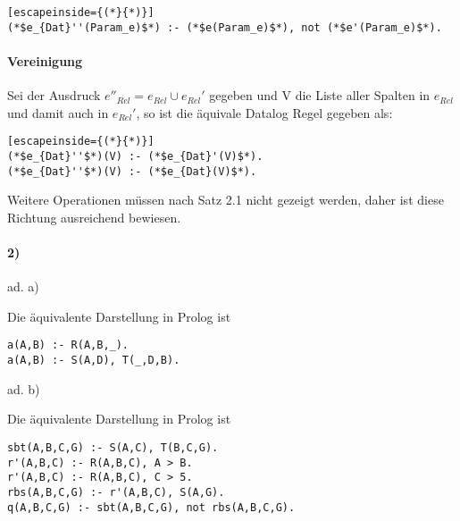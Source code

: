 \documentclass[12pt,a4paper]{amsart}
\begin{document}
\begin{aufgabe1}
\begin{lstlisting}[escapeinside={(*}{*)}]
(*$e_{Dat}''(Param_e)$*) :- (*$e(Param_e)$*), not (*$e'(Param_e)$*).
\end{lstlisting}

\paragraph{\textbf{Vereinigung}}
Sei der Ausdruck $e''_{Rel} = e_{Rel} \cup e_{Rel}'$ gegeben und V die Liste aller Spalten in $e_{Rel}$ und damit auch in $e_{Rel}'$, so ist die äquivale Datalog Regel gegeben als:

\begin{lstlisting}[escapeinside={(*}{*)}]
(*$e_{Dat}''$*)(V) :- (*$e_{Dat}'(V)$*).
(*$e_{Dat}''$*)(V) :- (*$e_{Dat}(V)$*).
\end{lstlisting}

Weitere Operationen müssen nach Satz 2.1 nicht gezeigt werden, daher ist diese Richtung ausreichend bewiesen.

\paragraph{2)}

\end{aufgabe1}


\begin{aufgabe1}
ad. a)

Die äquivalente Darstellung in Prolog ist

\begin{lstlisting}
a(A,B) :- R(A,B,_).
a(A,B) :- S(A,D), T(_,D,B).
\end{lstlisting}

ad. b)

Die äquivalente Darstellung in Prolog ist


\begin{lstlisting}
sbt(A,B,C,G) :- S(A,C), T(B,C,G).
r'(A,B,C) :- R(A,B,C), A > B.
r'(A,B,C) :- R(A,B,C), C > 5.
rbs(A,B,C,G) :- r'(A,B,C), S(A,G).
q(A,B,C,G) :- sbt(A,B,C,G), not rbs(A,B,C,G).
\end{lstlisting}
\end{aufgabe1}

\begin{aufgabe1}
\end{aufgabe1}
\end{document}
